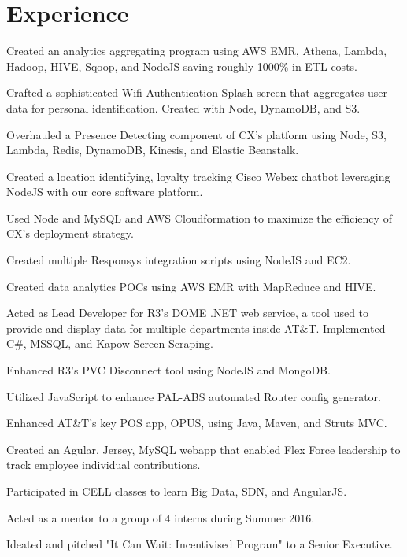 \documentclass[]{deedy-resume-openfont}
\begin{document}
\begin{minipage}[t]{0.66\textwidth} 


\section{Experience}

\vspace{\topsep} %
\begin{tightemize}
\item Created an analytics aggregating program using AWS EMR, Athena, Lambda, Hadoop, HIVE, Sqoop, and NodeJS  saving roughly 1000\% in ETL costs.
\item Crafted a sophisticated Wifi-Authentication Splash screen that aggregates user data for personal identification. Created with Node, DynamoDB, and S3.
\item Overhauled a Presence Detecting component of CX's platform using Node, S3, Lambda, Redis, DynamoDB, Kinesis, and Elastic Beanstalk.
\item Created a location identifying, loyalty tracking Cisco Webex chatbot leveraging NodeJS with our core software platform.
\item Used Node and MySQL and AWS Cloudformation to maximize the efficiency of CX's deployment strategy.
\item Created multiple Responsys integration scripts using NodeJS and EC2.
\item Created data analytics POCs using AWS EMR with MapReduce and HIVE.
\end{tightemize}
\sectionsep

\begin{tightemize}
\item Acted as Lead Developer for R3’s DOME .NET web service, a tool used to provide and display data for multiple departments inside AT&T. Implemented C#, MSSQL, and Kapow Screen Scraping.
\item Enhanced R3's PVC Disconnect tool using NodeJS and MongoDB.
\item Utilized JavaScript to enhance PAL-ABS automated Router config generator.
\item Enhanced AT\&T's key POS app, OPUS, using Java, Maven, and Struts MVC.
\item Created an Agular, Jersey, MySQL webapp that enabled Flex Force leadership to track employee individual contributions.
\item Participated in CELL classes to learn Big Data, SDN, and AngularJS.
\item Acted as a mentor to a group of 4 interns during Summer 2016.
\item Ideated and pitched "It Can Wait: Incentivised Program" to a Senior Executive.
\end{tightemize}
\sectionsep


\end{minipage}
\end{document}
